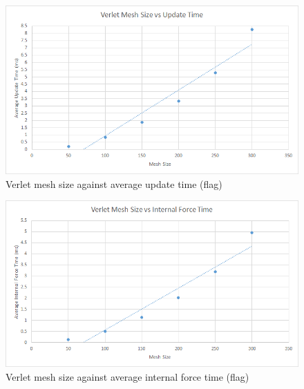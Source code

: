     \begin{figure}
    \begin{center}
      \includegraphics[scale=.9]{Figures/flag_v_m_ut}
    \end{center}
    \caption{Verlet mesh size against average update time (flag)}
    \label{fig:v mesh update flag}
  \end{figure}
  
    \begin{figure}
    \begin{center}
      \includegraphics[scale=.9]{Figures/flag_v_m_csf}
    \end{center}
    \caption{Verlet mesh size against average internal force time (flag)}
    \label{fig:v mesh csf flag}
  \end{figure}
  
